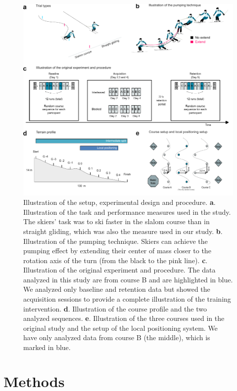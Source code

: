 \documentclass{article}
\begin{document}
\begin{figure}[H]
\centering
\includegraphics{figurer/figure_design_2.pdf}
\caption{Illustration of the setup, experimental design and procedure. \textbf{a}. Illustration of the task and performance measures used in the study. The skiers' task was to ski faster in the slalom course than in straight gliding, which was also the measure used in our study. \textbf{b}. Illustration of the pumping technique. Skiers can achieve the pumping effect by extending their center of mass closer to the rotation axis of the turn (from the black to the pink line). \textbf{c}. Illustration of the original experiment and procedure. The data analyzed in this study are from course B and are highlighted in blue. We analyzed only baseline and retention data but showed the acquisition sessions to provide a complete illustration of the training intervention. \textbf{d}. Illustration of the course profile and the two analyzed sequences. \textbf{e}. Illustration of the three courses used in the original study and the setup of the local positioning system. We have only analyzed data from course B (the middle), which is marked in blue.}\label{fig: design}
\end{figure}



\section{Methods}
\end{document}

